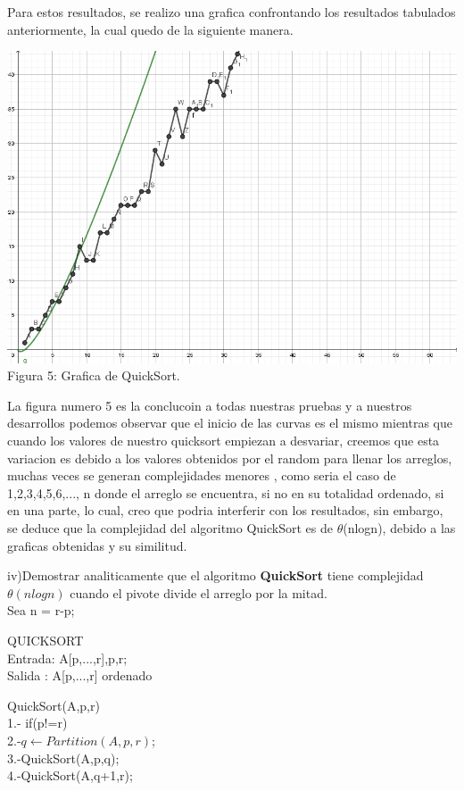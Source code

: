 \documentclass[spanish]{article}
\begin{document}
\newpage
	Para estos resultados, se realizo una grafica confrontando los resultados tabulados anteriormente, la cual quedo de la siguiente manera.\\
	\begin{center}
		\includegraphics[scale=.5]{./imagenes/qs.png}\\
		Figura 5: Grafica de QuickSort.
	\end{center}
	
	La figura numero 5 es la conclucoin a todas nuestras pruebas y a nuestros desarrollos podemos observar que el inicio de las curvas es el mismo mientras que cuando los valores de nuestro quicksort empiezan a desvariar, creemos que esta variacion es debido a los valores obtenidos por el random para llenar los arreglos, muchas veces se generan complejidades menores , como seria el caso de 1,2,3,4,5,6,..., n donde el arreglo se encuentra, si no en su totalidad ordenado, si en una parte, lo cual, creo que podria interferir con los resultados, sin embargo, se deduce que la complejidad del algoritmo QuickSort es de $\theta$(nlogn), debido a las graficas obtenidas y su similitud.

	\bigskip
\newpage
	{\large  iv)Demostrar analiticamente que el algoritmo {\bf QuickSort} tiene complejidad  $\theta(nlogn)$ cuando el pivote divide el arreglo por la mitad. }\\		

	\bigskip
	Sea n = r-p;
	\bigskip
	
	QUICKSORT\\
	Entrada: A[p,...,r],p,r;\\
	Salida : A[p,...,r] ordenado
	
	QuickSort(A,p,r)\\
	1.- if(p!=r)\\
	2.-\hspace{0.7cm}$q \leftarrow Partition(A,p,r)$;\\
	3.-\hspace{0.7cm}QuickSort(A,p,q);\\
	4.-\hspace{0.7cm}QuickSort(A,q+1,r);\\
	\bigskip
	
\end{document}
